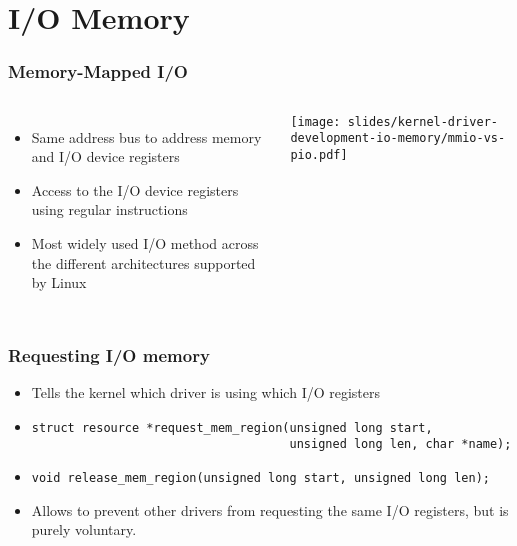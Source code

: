 \section{I/O Memory}

\begin{frame}
  \frametitle{Memory-Mapped I/O}
  \begin{columns}
  \begin{itemize}
    \item Same address bus to address memory and I/O device registers
    \item Access to the I/O device registers using regular instructions
    \item Most widely used I/O method across the different
      architectures supported by Linux
  \end{itemize}
    \texttt{[image: slides/kernel-driver-development-io-memory/mmio-vs-pio.pdf]}
  \end{columns}
\end{frame}

\begin{frame}[fragile]
  \frametitle{Requesting I/O memory}
  \begin{itemize}
  \item Tells the kernel which driver is using which I/O registers
  \item
\begin{verbatim}
struct resource *request_mem_region(unsigned long start,
                                    unsigned long len, char *name);
\end{verbatim}
  \item
\begin{verbatim}
void release_mem_region(unsigned long start, unsigned long len);
  \end{verbatim}
  \item Allows to prevent other drivers from requesting the same I/O registers,
    but is purely voluntary.
\end{itemize}
\end{frame}

